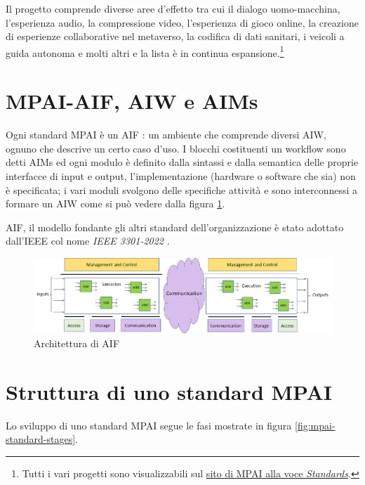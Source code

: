 Il progetto comprende diverse aree d'effetto tra cui il dialogo uomo-macchina, l'esperienza audio, la compressione video, l'esperienza di gioco online, la creazione di esperienze collaborative nel metaverso, la codifica di dati sanitari, i veicoli a guida autonoma e molti altri e la lista è in continua espansione.\footnote{Tutti i vari progetti sono visualizzabili sul \href{https://mpai.community/standards/}{sito di \ac{MPAI} alla voce \textit{Standards}}.}


\section{MPAI-AIF, AIW e AIMs} \label{sec:aif-aiw-aim}
Ogni standard \ac{MPAI} è un \ac{AIF} \cite{mpaiMPAIAIFMPAICommunity}: un ambiente che comprende diversi \ac{AIW}, ognuno che descrive un certo caso d'uso. I blocchi costituenti un workflow sono detti \acp{AIM} ed ogni modulo è definito dalla sintassi e dalla semantica delle proprie interfacce di input e output, l'implementazione (hardware o software che sia) non è specificata; i vari moduli svolgono delle specifiche attività e sono interconnessi a formare un AIW come si può vedere dalla figura \ref{fig:mpai-aif-architecture}.

\acs{AIF}, il modello fondante gli altri standard dell'organizzazione è stato adottato dall'\ac{IEEE} col nome \textit{IEEE 3301-2022} \cite{ieeeStandard3301-2022}.

\begin{figure}[h]
    \centering
    \includegraphics[width=\textwidth]{img/mpai-aif-architecture.png}
    \caption{Architettura di \acs{AIF} \cite{leonardoBlogNewWayDevelop2020}}
    \label{fig:mpai-aif-architecture}
\end{figure}


\section{Struttura di uno standard MPAI} \label{sec:standard-mpai} %
Lo sviluppo di uno standard MPAI segue le fasi mostrate in figura \ref{fig:mpai-standard-stages}.    %

